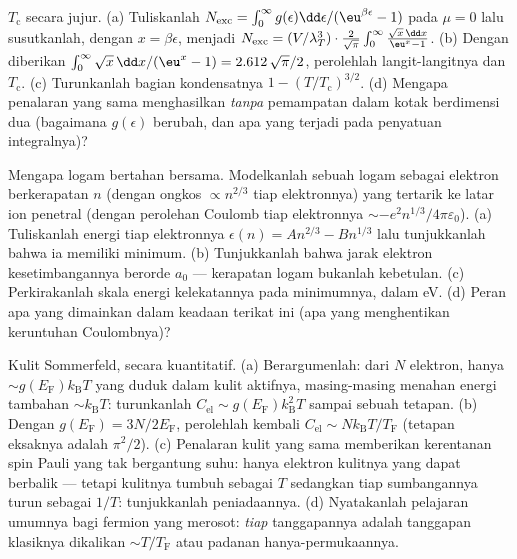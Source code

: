 \begin{exercise}[$\star\star\star$]\label{exo:b3:quantum-statistics:10}
$T_{\text{c}}$ secara jujur. (a) Tuliskanlah $N_{\text{exc}} = \int_0^\infty
g(\epsilon)\dd\epsilon/(\eu^{\beta\epsilon} - 1)$ pada $\mu = 0$ lalu
susutkanlah, dengan $x = \beta\epsilon$, menjadi $N_{\text{exc}} =
(V/\lambda_T^3)\cdot\frac{2}{\sqrt\pi}\int_0^\infty\frac{\sqrt
x\,\dd x}{\eu^x - 1}$. (b) Dengan diberikan $\int_0^\infty\sqrt x\,\dd x/(
\eu^x - 1) = 2.612\,\sqrt\pi/2$, perolehlah langit-langitnya dan
$T_{\text{c}}$. (c) Turunkanlah bagian kondensatnya $1 -
(T/T_{\text{c}})^{3/2}$. (d) Mengapa penalaran yang sama menghasilkan
\emph{tanpa} pemampatan dalam kotak berdimensi dua (bagaimana $g(
\epsilon)$ berubah, dan apa yang terjadi pada penyatuan
integralnya)?
\end{exercise}

\begin{exercise}[$\star\star\star$]\label{exo:b3:quantum-statistics:11}
Mengapa logam bertahan bersama. Modelkanlah sebuah logam sebagai
elektron berkerapatan
$n$ (dengan ongkos  $\propto n^{2/3}$ tiap elektronnya) yang
tertarik ke latar ion penetral (dengan perolehan Coulomb tiap elektronnya
$\sim -e^2n^{1/3}/4\pi\varepsilon_0$). (a) Tuliskanlah energi tiap
elektronnya $\epsilon(n) = An^{2/3} - Bn^{1/3}$ lalu tunjukkanlah bahwa
ia memiliki minimum. (b) Tunjukkanlah bahwa jarak elektron
kesetimbangannya berorde $a_0$ --- kerapatan logam bukanlah kebetulan.
(c) Perkirakanlah skala energi kelekatannya pada minimumnya, dalam eV.
(d) Peran apa yang dimainkan  dalam keadaan terikat
ini (apa yang menghentikan keruntuhan Coulombnya)?
\end{exercise}

\begin{exercise}[$\star\star\star$]\label{exo:b3:quantum-statistics:12}
Kulit Sommerfeld, secara kuantitatif. (a) Berargumenlah: dari $N$
elektron, hanya $\sim g(E_{\text{F}})k_{\text{B}}T$ yang duduk dalam
kulit aktifnya, masing-masing menahan energi tambahan
$\sim k_{\text{B}}T$: turunkanlah $C_{\text{el}}
\sim g(E_{\text{F}})k_{\text{B}}^2T$ sampai sebuah tetapan. (b) Dengan
$g(E_{\text{F}}) = 3N/2E_{\text{F}}$, perolehlah kembali $C_{\text{el}} \sim
Nk_{\text{B}}T/T_{\text{F}}$ (tetapan eksaknya adalah $\pi^2/2$).
(c) Penalaran kulit yang sama memberikan kerentanan spin Pauli yang tak
bergantung suhu: hanya elektron kulitnya yang dapat berbalik --- tetapi
kulitnya tumbuh sebagai $T$ sedangkan tiap sumbangannya turun sebagai $1/T$:
tunjukkanlah peniadaannya. (d) Nyatakanlah pelajaran umumnya bagi
fermion yang merosot: \emph{tiap} tanggapannya adalah tanggapan
klasiknya dikalikan $\sim T/T_{\text{F}}$ atau padanan hanya-permukaannya.
\end{exercise}

